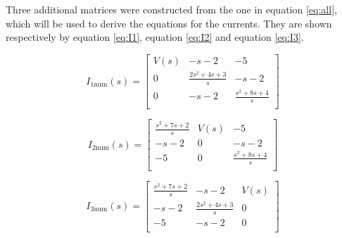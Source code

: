 \documentclass[12pt, a4paper]{article}
\begin{document}
	\noindent Three additional matrices were constructed from the one in equation \ref{eq:all}, which will be used to derive the equations for the currents. They are shown respectively by equation \ref{eq:I1}, equation \ref{eq:I2} and equation \ref{eq:I3}. 

	\begin{equation}
		\label{eq:I1}
		I_{1 \text{num}}(s) =
		\begin{bmatrix}
		    V(s)	&	-s-2	&	-5\\
		    0    & 	\frac{2s^2+4s+3}{s}  & 	-s-2\\
		    0    & 	-s-2  & 	\frac{s^2+8s+4}{s}\\
		\end{bmatrix}
	\end{equation}

	\begin{equation}
		\label{eq:I2}
		I_{2 \text{num}}(s) =
		\begin{bmatrix}
		    \frac{s^2+7s+2}{s}	&	V(s)	&	-5\\
		    -s-2      			& 	0  & 	-s-2\\
		    -5      			& 	0  & 	\frac{s^2+8s+4}{s}\\
		\end{bmatrix}
	\end{equation}

	\begin{equation}
		\label{eq:I3}
		I_{3 \text{num}}(s) =
		\begin{bmatrix}
		    \frac{s^2+7s+2}{s}	&	-s-2	&	V(s)\\
		    -s-2      			& 	\frac{2s^2+4s+3}{s}  & 	0\\
		    -5      			& 	-s-2  & 	0\\
		\end{bmatrix}
	\end{equation}



\end{document}
